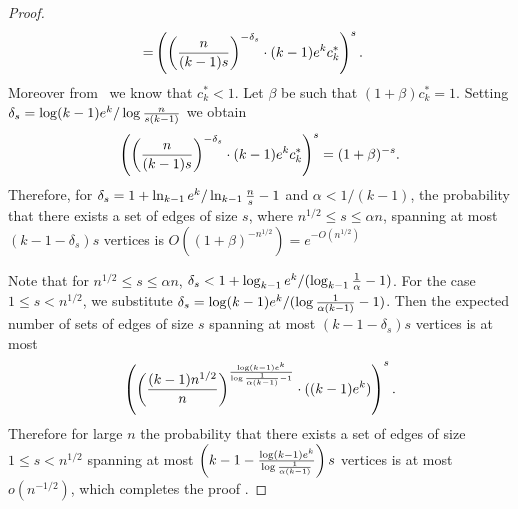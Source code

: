 \begin{proof}
\begin{align*}
= & \left(\left({n\over (k-1)s}\right)^{-\delta_s} \cdot (k-1){e^{k} c^*_k}\right)^s .
\end{align*}
Moreover from~\cite{fp12} we know that $c^*_k <1.$ Let $\beta$ be such that $(1+\beta)c^*_k =1$.
Setting  $\delta_s = {\log (k-1)e^{k} / \log {n\over s(k-1)}}$ we obtain
\[ \left(\left({n\over (k-1)s}\right)^{-\delta_s} \cdot (k-1){e^{k} c^*_k}\right)^s = (1+\beta)^{-s}.\]
Therefore, for $\delta_s = {1+\ln_{k-1}e^{k} / \ln_{k-1}{n\over s}-1}$ and $\alpha< {1/( k-1)}$, the probability that there exists a set  of edges of size $s$, where $n^{1/2}\le s\le \alpha n$, spanning at most $(k-1-\delta_s) s$ vertices is $O((1+\beta)^{-n^{1/2}}) =e^{-O(n^{1/2})}$ 

Note that for $n^{1/2}\le s\le \alpha n$, $\delta_s < {1+\log_{k-1}e^{k}/(\log_{k-1}{1\over \alpha}-1)}$.
For the case $1\le s<n^{1/2}$, we substitute $\delta_s= {\log (k-1)e^{k}/(\log {1\over \alpha(k-1)}-1})$.
Then the expected number of sets of edges of size $s$  spanning at most $(k-1- \delta_s)s $ vertices is at most
\begin{equation*}
\begin{split}
  \left(\left({ (k-1)n^{1/2} \over n}\right)^{\log (k-1)e^{k} \over \log {1\over \alpha(k-1)}-1} \cdot ((k-1)e^{k}) \right)^s.    \end{split}
\end{equation*}
Therefore for large $n$ the probability that there exists a set  of edges of size $1\le s< n^{1/2}$ spanning at most $\left(k-1-{\log (k-1)e^{k} \over \log {1\over \alpha(k-1)}}\right) s$ vertices is at most $o(n^{-1/2})$, which completes the proof .
\end{proof}

